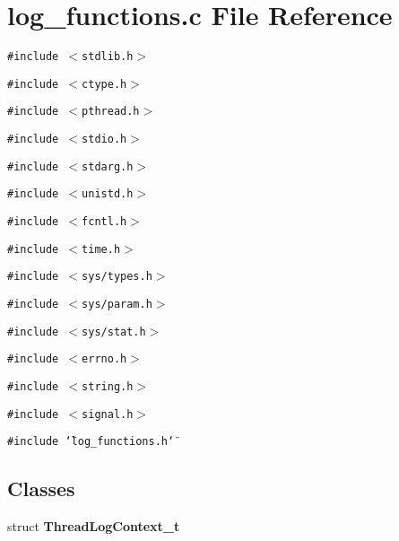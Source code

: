 \section{log\_\-functions.c File Reference}
\label{log__functions_8c}
{\tt \#include $<$stdlib.h$>$}\par
{\tt \#include $<$ctype.h$>$}\par
{\tt \#include $<$pthread.h$>$}\par
{\tt \#include $<$stdio.h$>$}\par
{\tt \#include $<$stdarg.h$>$}\par
{\tt \#include $<$unistd.h$>$}\par
{\tt \#include $<$fcntl.h$>$}\par
{\tt \#include $<$time.h$>$}\par
{\tt \#include $<$sys/types.h$>$}\par
{\tt \#include $<$sys/param.h$>$}\par
{\tt \#include $<$sys/stat.h$>$}\par
{\tt \#include $<$errno.h$>$}\par
{\tt \#include $<$string.h$>$}\par
{\tt \#include $<$signal.h$>$}\par
{\tt \#include \char`\"{}log\_\-functions.h\char`\"{}}\par
\subsection*{Classes}
\begin{CompactItemize}
\item 
struct {\bf Thread\-Log\-Context\_\-t}
\end{CompactItemize}
